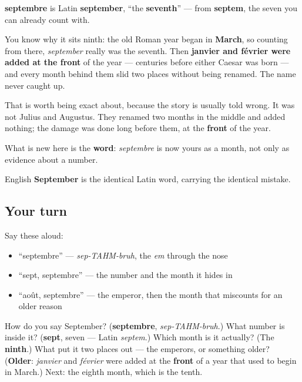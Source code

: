 \begin{cousinweb}
\textbf{septembre} is Latin \textbf{september}, \textquotedblleft{}the \textbf{seventh}\textquotedblright{} — from \textbf{septem}, the seven you can already count with.

You know why it sits ninth: the old Roman year began in \textbf{March}, so counting from there, \emph{september} really was the seventh. Then \textbf{janvier and février were added at the front} of the year — centuries before either Caesar was born — and every month behind them slid two places without being renamed. The name never caught up.

That is worth being exact about, because the story is usually told wrong. It was not Julius and Augustus. They renamed two months in the middle and added nothing; the damage was done long before them, at the \textbf{front} of the year.

What is new here is the \textbf{word}: \emph{septembre} is now yours as a month, not only as evidence about a number.

English \textbf{September} is the identical Latin word, carrying the identical mistake.
\end{cousinweb}

\subsection*{Your turn}
Say these aloud:

\begin{itemize}
\raggedright
  \item \textquotedblleft{}septembre\textquotedblright{} — \emph{sep-TAHM-bruh}, the \emph{em} through the nose
  \item \textquotedblleft{}sept, septembre\textquotedblright{} — the number and the month it hides in
  \item \textquotedblleft{}août, septembre\textquotedblright{} — the emperor, then the month that miscounts for an older reason
\end{itemize}

\begin{tcolorbox}[breakable,colback=teal!4,colframe=teal!35!black,title={Before you move on}]
How do you say September? (\textbf{septembre}, \emph{sep-TAHM-bruh}.) What number is inside it? (\textbf{sept}, seven — Latin \emph{septem}.) Which month is it actually? (The \textbf{ninth}.) What put it two places out — the emperors, or something older? (\textbf{Older}: \emph{janvier} and \emph{février} were added at the \textbf{front} of a year that used to begin in March.) Next: the eighth month, which is the tenth.
\end{tcolorbox}
